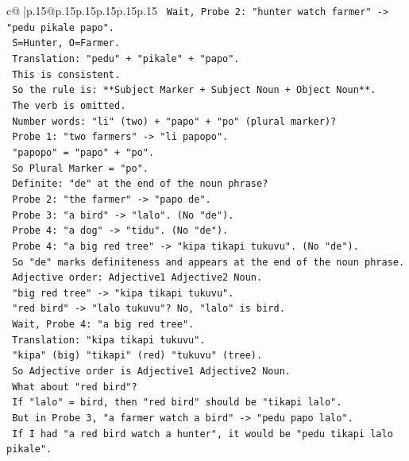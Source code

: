 \documentclass{article}
\begin{document}
{\begin{supertabular}{c@{$\;$}|p{.15\linewidth}@{}p{.15\linewidth}p{.15\linewidth}p{.15\linewidth}p{.15\linewidth}p{.15\linewidth}}
{{{\texttt{    Wait, Probe 2: "hunter watch farmer" {-}> "pedu pikale papo".} \\
\texttt{    S=Hunter, O=Farmer.} \\
\texttt{    Translation: "pedu" + "pikale" + "papo".} \\
\texttt{    This is consistent.} \\
\texttt{    So the rule is: **Subject Marker + Subject Noun + Object Noun**.} \\
\texttt{    The verb is omitted.} \\
\texttt{    Number words: "li" (two) + "papo" + "po" (plural marker)?} \\
\texttt{    Probe 1: "two farmers" {-}> "li papopo".} \\
\texttt{    "papopo" = "papo" + "po".} \\
\texttt{    So Plural Marker = "po".} \\
\texttt{    Definite: "de" at the end of the noun phrase?} \\
\texttt{    Probe 2: "the farmer" {-}> "papo de".} \\
\texttt{    Probe 3: "a bird" {-}> "lalo". (No "de").} \\
\texttt{    Probe 4: "a dog" {-}> "tidu". (No "de").} \\
\texttt{    Probe 4: "a big red tree" {-}> "kipa tikapi tukuvu". (No "de").} \\
\texttt{    So "de" marks definiteness and appears at the end of the noun phrase.} \\
\texttt{    Adjective order: Adjective1 Adjective2 Noun.} \\
\texttt{    "big red tree" {-}> "kipa tikapi tukuvu".} \\
\texttt{    "red bird" {-}> "lalo tukuvu"? No, "lalo" is bird.} \\
\texttt{    Wait, Probe 4: "a big red tree".} \\
\texttt{    Translation: "kipa tikapi tukuvu".} \\
\texttt{    "kipa" (big) "tikapi" (red) "tukuvu" (tree).} \\
\texttt{    So Adjective order is Adjective1 Adjective2 Noun.} \\
\texttt{    What about "red bird"?} \\
\texttt{    If "lalo" = bird, then "red bird" should be "tikapi lalo".} \\
\texttt{    But in Probe 3, "a farmer watch a bird" {-}> "pedu papo lalo".} \\
\texttt{    If I had "a red bird watch a hunter", it would be "pedu tikapi lalo pikale".} \\
}}}
\end{supertabular}}
\end{document}
